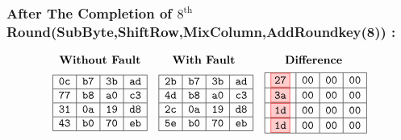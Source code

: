 \subsubsection{After The Completion of $8^{\text{th}}$ Round(SubByte,ShiftRow,MixColumn,AddRoundkey(8)) :}
\[
\begin{array}{ccc}
\textbf{Without Fault} & \textbf{With Fault } & \textbf{Difference } \\[1ex]
\begin{array}{|c|c|c|c|}
\hline
\texttt{0c} & \texttt{b7} & \texttt{3b} & \texttt{ad} \\
\hline
\texttt{77} & \texttt{b8} & \texttt{a0} & \texttt{c3} \\
\hline
\texttt{31} & \texttt{0a} & \texttt{19} & \texttt{d8} \\
\hline
\texttt{43} & \texttt{b0} & \texttt{70} & \texttt{eb} \\
\hline
\end{array} 
&

\begin{array}{|c|c|c|c|}
    \hline
    \texttt{2b} & \texttt{b7} & \texttt{3b} & \texttt{ad} \\
    \hline
    \texttt{4d} & \texttt{b8} & \texttt{a0} & \texttt{c3} \\
    \hline
    \texttt{2c} & \texttt{0a} & \texttt{19} & \texttt{d8} \\
    \hline
    \texttt{5e} & \texttt{b0} & \texttt{70} & \texttt{eb} \\
    \hline
    \end{array}

    &

\begin{array}{|c|c|c|c|}
    \hline
    \fcolorbox{red}{red!20}{\texttt{27}} & \texttt{00} & \texttt{00} & \texttt{00} \\
    \hline
    \fcolorbox{red}{red!20}{\texttt{3a}} & \texttt{00} & \texttt{00} & \texttt{00}  \\
    \hline
    \fcolorbox{red}{red!20}{\texttt{1d}} & \texttt{00} & \texttt{00} & \texttt{00}  \\
    \hline
    \fcolorbox{red}{red!20}{\texttt{1d}} & \texttt{00} & \texttt{00} & \texttt{00}  \\
    \hline
    \end{array}
\end{array}
\]

